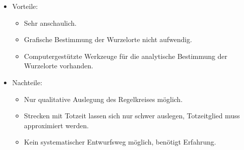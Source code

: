 \begin{itemize}
	\item Vorteile: 
	\begin{itemize}
		\item Sehr anschaulich.
		\item Grafische Bestimmung der Wurzelorte nicht aufwendig.
		\item Computergestützte Werkzeuge für die analytische Bestimmung der Wurzelorte vorhanden.
	\end{itemize}
	\item Nachteile:
	\begin{itemize}
		\item Nur qualitative Auslegung des Regelkreises möglich.
		\item Strecken mit Totzeit lassen sich nur schwer auslegen, Totzeitglied muss approximiert werden.
		\item Kein systematischer Entwurfsweg möglich, benötigt Erfahrung.
	\end{itemize}
\end{itemize}
%
